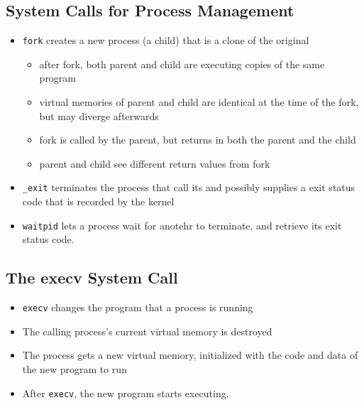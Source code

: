\documentclass[twoside]{article}
\begin{document}
\subsection{System Calls for Process Management}
\begin{itemize}
\item \verb|fork| creates a new process (a child) that is a clone of the original
\begin{itemize}
\item after fork, both parent and child are executing copies of the same program
\item virtual memories of parent and child are identical at the time of the fork, but
may diverge afterwards
\item fork is called by the parent, but returns in both the parent and the child
\item parent and child see different return values from fork
\end{itemize}
\item \verb|_exit| terminates the process that call its and possibly supplies a exit status code that is recorded by the kernel 
\item \verb|waitpid| lets a process wait for anotehr to terminate, and retrieve its exit status code. 
\end{itemize}

\subsection{The execv System Call}
\begin{itemize}
\item \verb|execv| changes the program that a process is running 
\item The calling process's current virtual memory is destroyed
\item The process gets a new virtual memory, initialized with the code and data of the new program to run
\item After \verb|execv|, the new program starts executing. 
\end{itemize}
\end{document}
